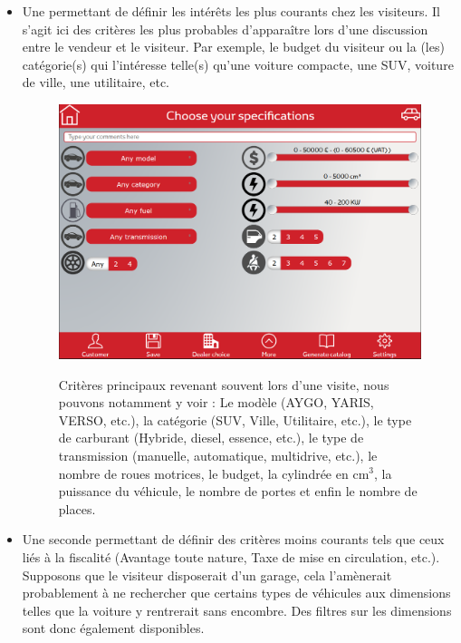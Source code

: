 \documentclass[12pt]{report}
\begin{document}
\begin{itemize}
\paragraph{}
\item Une permettant de définir les intérêts les plus courants chez les visiteurs. Il s'agit ici des critères les plus probables d'apparaître lors d'une discussion entre le vendeur et le visiteur. Par exemple, le budget du visiteur ou la (les) catégorie(s) qui l'intéresse telle(s) qu'une voiture compacte, une SUV, voiture de ville, une utilitaire, etc.

\begin{figure}[H]
	\caption {
	Critères principaux revenant souvent lors d'une visite, nous pouvons notamment y voir : Le modèle (AYGO, YARIS, 
	VERSO, etc.), la catégorie (SUV, Ville, Utilitaire, etc.), le type de carburant (Hybride, diesel, essence, etc.), 
	le type de transmission (manuelle, automatique, multidrive, etc.), le nombre de roues motrices, le budget, la 
	cylindrée en cm$^{3}$, la puissance du véhicule, le nombre de portes et enfin le nombre de places.
	}
	\includegraphics[width=\linewidth]{img/image_product_1}
	\label{image_product_1}
\end{figure}

\item Une seconde permettant de définir des critères moins courants tels que ceux liés à la fiscalité (Avantage toute nature, Taxe de mise en circulation, etc.). 
Supposons que le visiteur disposerait d'un garage, cela l'amènerait probablement à ne rechercher que certains types de véhicules aux dimensions telles que la voiture y rentrerait sans encombre. Des filtres sur les dimensions sont donc également disponibles.


\end{itemize}
\end{document}
